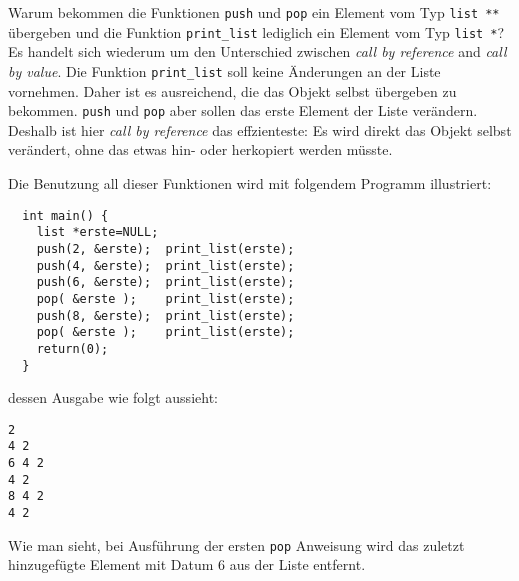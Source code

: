 Warum bekommen die Funktionen \verb|push| und \verb|pop| ein Element vom Typ \verb|list **| übergeben und die Funktion \verb|print_list| lediglich ein Element vom Typ \verb|list *|?
Es handelt sich wiederum um den Unterschied zwischen \emph{call by reference} and \emph{call by value}.
Die Funktion \verb|print_list| soll keine Änderungen an der Liste vornehmen.
Daher ist es ausreichend, die das Objekt selbst übergeben zu bekommen.
\verb|push| und \verb|pop| aber sollen das erste Element der Liste verändern.
Deshalb ist hier \emph{call by reference} das effzienteste: Es wird direkt das Objekt selbst verändert, ohne das etwas hin- oder herkopiert werden müsste.

Die Benutzung all dieser Funktionen wird mit folgendem Programm illustriert:
\begin{lstlisting}
  int main() {
    list *erste=NULL;
    push(2, &erste);  print_list(erste);
    push(4, &erste);  print_list(erste);
    push(6, &erste);  print_list(erste);
    pop( &erste );    print_list(erste);
    push(8, &erste);  print_list(erste);
    pop( &erste );    print_list(erste);
    return(0);
  }
\end{lstlisting}
dessen Ausgabe wie folgt aussieht:
\begin{verbatim}
2	
4 2
6 4 2	
4 2
8 4 2	
4 2
\end{verbatim}
Wie man sieht, bei Ausführung der ersten \texttt{pop} Anweisung wird das zuletzt hinzugefügte Element mit Datum $6$ aus der Liste entfernt.

\endinput

